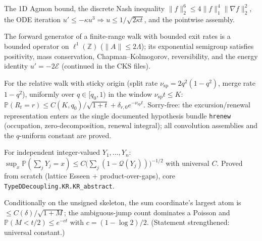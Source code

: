 \begin{lemma}\label{lem:nash}
  \leanok
  The 1D Agmon bound, the discrete Nash inequality
  $\|f\|_2^6 \le 4\|f\|_1^4\|\nabla f\|_2^2$, the ODE iteration
  $u' \le -\kappa u^3 \Rightarrow u \le 1/\sqrt{2\kappa t}$, and the pointwise assembly.
\end{lemma}

\begin{lemma}\label{lem:semigroup}
  \leanok
  The forward generator of a finite-range walk with bounded exit rates is a bounded
  operator on $\ell^1(\mathbb Z)$ ($\|A\| \le 2\Lambda$); its exponential semigroup
  satisfies positivity, mass conservation, Chapman--Kolmogorov, reversibility, and the
  energy identity $u' = -2\mathcal E$ (continued in the CKS files).
\end{lemma}

\begin{lemma}\label{lem:Rlclt}
  \leanok
  For the relative walk with sticky origin (split rate $\nu_{\mathrm{sp}} = 2q^2(1-q^2)$,
  merge rate $1-q^2$), uniformly over $q \in [q_0,1)$ in the window
  $\nu_{\mathrm{sp}} t \le K$:
  $\mathbb P(R_t = r) \le C(K,q_0)/\sqrt{1+t} + \delta_{r,0}e^{-\nu_{\mathrm{sp}}t}$.
  Sorry-free: the excursion/renewal representation enters as the single documented
  hypothesis bundle \texttt{hrenew} (occupation, zero-decomposition, renewal integral);
  all convolution assemblies and the $q$-uniform constant are proved.
\end{lemma}

\begin{lemma}\label{lem:KR}
  \leanok
  For independent integer-valued $Y_1,\dots,Y_n$:
  $\sup_x \mathbb P(\sum_j Y_j = x) \le C\big(\sum_j(1-\mathcal Q(Y_j))\big)^{-1/2}$
  with universal $C$.  Proved from scratch (lattice Esseen + product-over-gaps),
  core \texttt{TypeDDecoupling.KR.KR\_abstract}.
\end{lemma}

\begin{lemma}\label{lem:Slclt}
  \leanok
  Conditionally on the unsigned skeleton, the sum coordinate's largest atom is
  $\le C(\delta)/\sqrt{1+M}$; the ambiguous-jump count dominates a Poisson and
  $\mathbb P(M < t/2) \le e^{-ct}$ with $c = (1-\log 2)/2$.
  (Statement strengthened: universal constant.)
\end{lemma}

